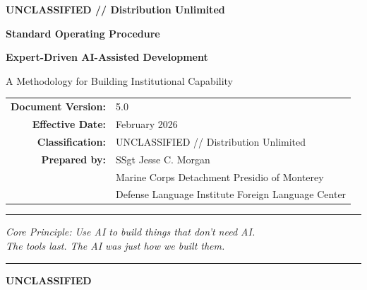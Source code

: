 \documentclass[11pt,letterpaper]{article}
\begin{document}
\thispagestyle{empty}

\begin{center}

\vspace*{1.5in}

{\Large\textbf{UNCLASSIFIED // Distribution Unlimited}}

\vspace{0.75in}

{\LARGE\textbf{Standard Operating Procedure}}

\vspace{0.3in}

{\Huge\bfseries\color{scarlet} Expert-Driven AI-Assisted Development}

\vspace{0.3in}

{\Large A Methodology for Building Institutional Capability}

\vspace{1in}

\begin{tabular}{rl}
\textbf{Document Version:} & 5.0 \\[4pt]
\textbf{Effective Date:}    & February 2026 \\[4pt]
\textbf{Classification:}    & UNCLASSIFIED // Distribution Unlimited \\[4pt]
\textbf{Prepared by:}       & SSgt Jesse C. Morgan \\
                             & Marine Corps Detachment Presidio of Monterey \\
                             & Defense Language Institute Foreign Language Center \\
\end{tabular}

\vfill

\rule{0.8\textwidth}{0.4pt}

\medskip

{\small\itshape Core Principle: Use AI to build things that don't need AI.\\
The tools last. The AI was just how we built them.}

\medskip

\rule{0.8\textwidth}{0.4pt}

\vspace{0.5in}

{\small\textbf{UNCLASSIFIED}}

\end{center}
\end{document}
